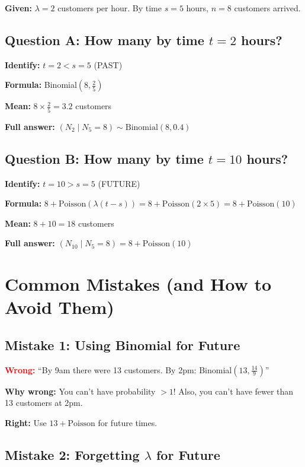 \documentclass[11pt]{article}
\begin{document}
\textbf{Given:} $\lambda = 2$ customers per hour. By time $s = 5$ hours, $n = 8$ customers arrived.

\subsection{Question A: How many by time $t = 2$ hours?}

\textbf{Identify:} $t = 2 < s = 5$ (PAST)

\textbf{Formula:} Binomial$(8, \frac{2}{5})$

\textbf{Mean:} $8 \times \frac{2}{5} = 3.2$ customers

\textbf{Full answer:} $(N_2 \mid N_5 = 8) \sim \text{Binomial}(8, 0.4)$

\subsection{Question B: How many by time $t = 10$ hours?}

\textbf{Identify:} $t = 10 > s = 5$ (FUTURE)

\textbf{Formula:} $8 + \text{Poisson}(\lambda(t-s)) = 8 + \text{Poisson}(2 \times 5) = 8 + \text{Poisson}(10)$

\textbf{Mean:} $8 + 10 = 18$ customers

\textbf{Full answer:} $(N_{10} \mid N_5 = 8) = 8 + \text{Poisson}(10)$

\section{Common Mistakes (and How to Avoid Them)}

\subsection{Mistake 1: Using Binomial for Future}

\textcolor{red}{\textbf{Wrong:}} ``By 9am there were 13 customers. By 2pm: Binomial$(13, \frac{14}{9})$''

\textbf{Why wrong:} You can't have probability $> 1$! Also, you can't have fewer than 13 customers at 2pm.

\textcolor{green!60!black}{\textbf{Right:}} Use $13 + \text{Poisson}$ for future times.

\subsection{Mistake 2: Forgetting $\lambda$ for Future}
\end{document}
